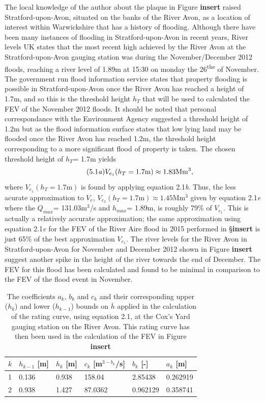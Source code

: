 \documentclass[11pt,a4paper]{article}
\begin{document}
The local knowledge of the author about the plaque in Figure \textbf{insert} raised Stratford-upon-Avon, situated on the banks of the River Avon, as a location of interest within Warwickshire that has a history of flooding. Although there have been many instances of flooding in Stratford-upon-Avon in recent years, River levels UK \cite{recent-high} states that the most recent high achieved by the River Avon at the Stratford-upon-Avon gauging station was during the November/December 2012 floods, reaching a river level of 1.89m at 15:30 on monday the 26\textsuperscript{the} of November. The government run flood information service \cite{ht} states that property flooding is possible in Stratford-upon-Avon once the River Avon has reached a height of 1.7m, and so this is the threshold height $h_T$ that will be used to calculated the FEV of the November 2012 floods. It should be noted that personal correspondance with the Environment Agency \cite{EA} suggested a threshold height of 1.2m but as the flood information surface states that low lying land may be flooded once the River Avon has reached 1.2m, the threshold height corresponding to a more significant flood of property is taken. The chosen threshold height of $h_T$= 1.7m yields
\begin{equation}\tag{5.1\textit{a}}
V_{e_1}(h_T=\text{1.7m})\approx 1.83\text{Mm$^3$},
\end{equation}
where $V_{e_1}(h_T=\text{1.7m})$ is found by applying equation 2.1\textit{b}. Thus, the less acurate approximation to $V_e$, $V_{e_3}(h_T=\text{1.7m})\approx 1.45\text{Mm$^3$}$ given by equation 2.1\textit{e} where the $Q_{max}$= 131.03m$^3$/s and $h_{max}$= 1.89m, is roughly 79\% of $V_{e_1}$. This is actually a relatively accurate approximation{;} the same approximation using equation 2.1\textit{e} for the FEV of the River Aire flood in 2015 performed in \S \textbf{insert} is just 65\% of the best approximation $V_{e_1}$. The river levels for the River Avon in Stratford-upon-Avon for November and December 2012 shown in Figure \textbf{insert} suggest another spike in the height of the river towards the end of December. The FEV for this flood has been calculated and found to be minimal in comparison to the FEV of the flood event in November. 

\begin{table}[ht!]
\begin{tabular}{l|l|l|l|l|l}
$k$ & $h_{k-1}$ [m] & $h_k$ [m] & $c_k$ [m$^{3-b_k}$/s] & $b_k$ [-] & $a_k$ [m]\\
\hline
1 & 0.136 & 0.938 & 158.04 & 2.85438 & 0.262919 \\
2 & 0.938 & 1.427 & 87.0362 & 0.962129 & 0.358741 \\
\end{tabular}
\caption{The coefficients $a_k$, $b_k$ and $c_k$ and their corresponding upper ($h_k$) and lower ($h_{k-1}$) bounds on $\overline{h}$ \cite{EA} applied in the calculation of the rating curve, using equation 2.1, at the Cox's Yard gauging station on the River Avon. This rating curve has then been used in the calculation of the FEV in Figure \textbf{insert}}
\end{table}
\end{document}
